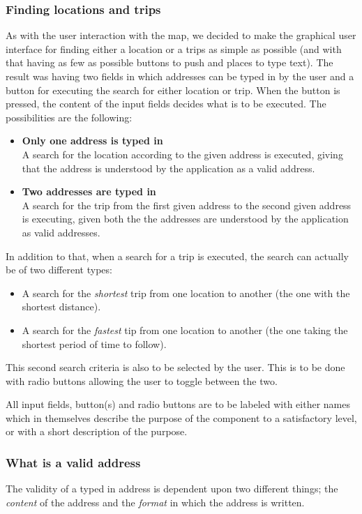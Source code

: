 \documentclass[a4paper,11pt]{article}
\begin{document}
\subsubsection{Finding locations and trips}
As with the user interaction with the map, we decided to make the graphical user interface for finding either a location or a trips as simple as possible (and with that having as few as possible buttons to push and places to type text). The result was having two fields in which addresses can be typed in by the user and a button for executing the search for either location or trip. When the button is pressed, the content of the input fields decides what is to be executed. The possibilities are the following:
\begin{itemize}
	\item \textbf{Only one address is typed in} \\
		A search for the location according to the given address is executed, giving that the address is understood by the application as a valid address.
	\item \textbf{Two addresses are typed in} \\
		A search for the trip from the first given address to the second given address is executing, given both the the addresses are understood by the application as valid addresses.
\end{itemize}
In addition to that, when a search for a trip is executed, the search can actually be of two different types:
\begin{itemize}
	\item A search for the \textit{shortest} trip from one location to another (the one with the shortest distance).
	\item A search for the \textit{fastest} tip from one location to another (the one taking the shortest period of time to follow).
\end{itemize}
This second search criteria is also to be selected by the user. This is to be done with radio buttons allowing the user to toggle between the two.

All input fields, button(s) and radio buttons are to be labeled with either names which in themselves describe the purpose of the component to a satisfactory level, or with a short description of the purpose.

\subsubsection{What is a valid address}
The validity of a typed in address is dependent upon two different things; the \textit{content} of the address and the \textit{format} in which the address is written.
\end{document}
